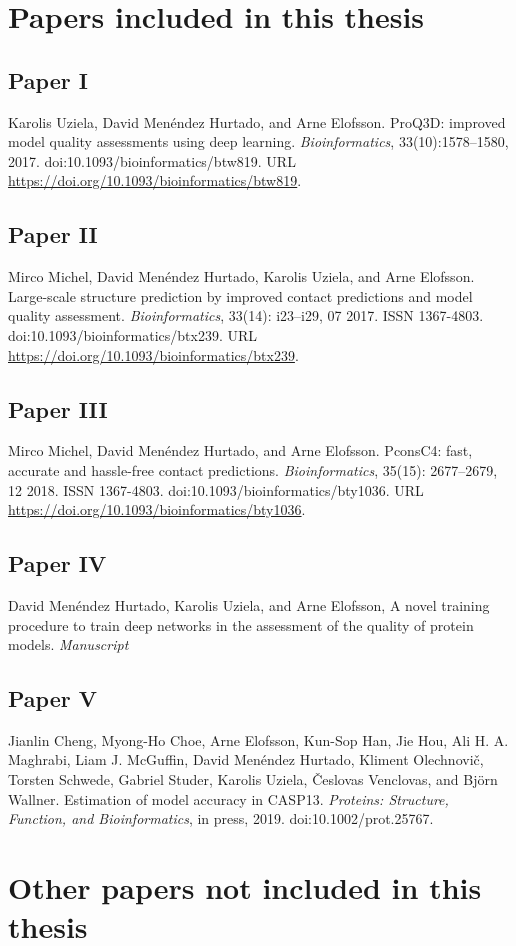 \chapter*{Papers included in this thesis}

\section*{Paper \textcolor[cmyk]{0, 0.87, 0.68, 0.32}{I}}
Karolis Uziela, David Menéndez Hurtado, and Arne Elofsson.
ProQ3D: improved model quality assessments using deep learning. \textit{Bioinformatics}, 33(10):1578–1580, 2017. doi:10.1093/bioinformatics/btw819.
URL \url{ https://doi.org/10.1093/bioinformatics/btw819}.

\section*{Paper  \textcolor[cmyk]{0, 0.87, 0.68, 0.32}{II}}
Mirco Michel, David Menéndez Hurtado, Karolis Uziela, and Arne Elofsson.
Large-scale structure
prediction by improved contact predictions and model quality assessment. \textit{Bioinformatics}, 33(14):
i23–i29, 07 2017. ISSN 1367-4803. doi:10.1093/bioinformatics/btx239. URL
\url{https://doi.org/10.1093/bioinformatics/btx239}.


\section*{Paper \textcolor[cmyk]{0, 0.87, 0.68, 0.32}{III}}
Mirco Michel, David Menéndez Hurtado, and Arne Elofsson. PconsC4: fast, accurate and hassle-free
contact predictions. \textit{Bioinformatics}, 35(15): 2677–2679, 12 2018. ISSN 1367-4803.
doi:10.1093/bioinformatics/bty1036. URL \url{https://doi.org/10.1093/bioinformatics/bty1036}.


\section*{Paper \textcolor[cmyk]{0, 0.87, 0.68, 0.32}{IV}}
David Menéndez Hurtado, Karolis Uziela, and Arne Elofsson, A novel training procedure to train deep networks in the assessment of the quality of protein models. \emph{Manuscript}


\section*{Paper \textcolor[cmyk]{0, 0.87, 0.68, 0.32}{V}}

Jianlin Cheng, Myong-Ho Choe, Arne Elofsson, Kun-Sop Han, Jie Hou, Ali H. A. Maghrabi, Liam J.
McGuffin, David Menéndez Hurtado, Kliment Olechnovič, Torsten Schwede, Gabriel Studer, Karolis
Uziela, Česlovas Venclovas, and Björn Wallner. Estimation of model accuracy in CASP13. \emph{Proteins:
Structure, Function, and Bioinformatics}, in press, 2019. doi:10.1002/prot.25767.

\chapter*{Other papers not included in this thesis}
